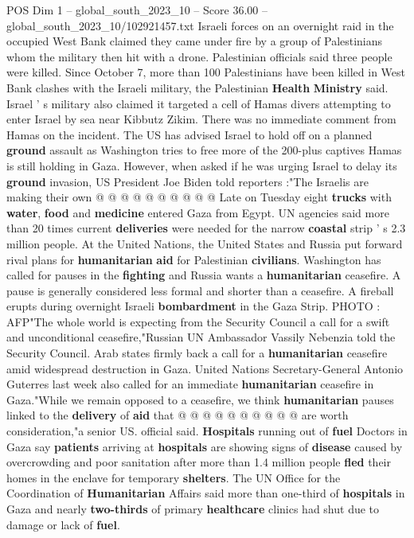\begin{textsample}{POS Dim 1 – global\_south\_2023\_10 – Score 36.00 – global\_south\_2023\_10/102921457.txt}
Israeli forces on an overnight raid in the occupied West Bank claimed they came under fire by a group of Palestinians whom the military then hit with a drone.
Palestinian officials said three people were killed.
Since October 7, more than 100 Palestinians have been killed in West Bank clashes with the Israeli military, the Palestinian \textbf{Health} \textbf{Ministry} said.
Israel ' s military also claimed it targeted a cell of Hamas divers attempting to enter Israel by sea near Kibbutz Zikim.
There was no immediate comment from Hamas on the incident.
The US has advised Israel to hold off on a planned \textbf{ground} assault as Washington tries to free more of the 200-plus captives Hamas is still holding in Gaza.
However, when asked if he was urging Israel to delay its \textbf{ground} invasion, US President Joe Biden told reporters :"The Israelis are making their own @ @ @ @ @ @ @ @ @ @ Late on Tuesday eight \textbf{trucks} with \textbf{water}, \textbf{food} and \textbf{medicine} entered Gaza from Egypt.
UN agencies said more than 20 times current \textbf{deliveries} were needed for the narrow \textbf{coastal} strip ' s 2.3 million people.
At the United Nations, the United States and Russia put forward rival plans for \textbf{humanitarian} \textbf{aid} for Palestinian \textbf{civilians}.
Washington has called for pauses in the \textbf{fighting} and Russia wants a \textbf{humanitarian} ceasefire.
A pause is generally considered less formal and shorter than a ceasefire.
A fireball erupts during overnight Israeli \textbf{bombardment} in the Gaza Strip.
PHOTO : AFP"The whole world is expecting from the Security Council a call for a swift and unconditional ceasefire,"Russian UN Ambassador Vassily Nebenzia told the Security Council.
Arab states firmly back a call for a \textbf{humanitarian} ceasefire amid widespread destruction in Gaza.
United Nations Secretary-General Antonio Guterres last week also called for an immediate \textbf{humanitarian} ceasefire in Gaza."While we remain opposed to a ceasefire, we think \textbf{humanitarian} pauses linked to the \textbf{delivery} of \textbf{aid} that @ @ @ @ @ @ @ @ @ @ are worth consideration,"a senior US. official said. \textbf{Hospitals} running out of \textbf{fuel} Doctors in Gaza say \textbf{patients} arriving at \textbf{hospitals} are showing signs of \textbf{disease} caused by overcrowding and poor sanitation after more than 1.4 million people \textbf{fled} their homes in the enclave for temporary \textbf{shelters}.
The UN Office for the Coordination of \textbf{Humanitarian} Affairs said more than one-third of \textbf{hospitals} in Gaza and nearly \textbf{two-thirds} of primary \textbf{healthcare} clinics had shut due to damage or lack of \textbf{fuel}.

\end{textsample}
